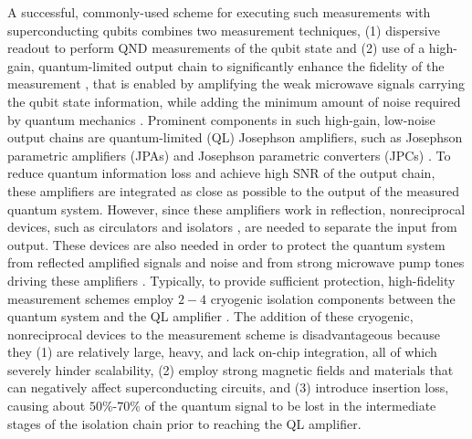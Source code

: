 \documentclass[aip,onecolumn,10pt]{revtex4}%
\begin{document}
A successful, commonly-used scheme for executing such measurements with superconducting qubits combines two measurement techniques, (1) dispersive readout to perform QND measurements of the qubit state \cite{QED,QEDcooperBox} and (2) use of a high-gain, quantum-limited output chain to significantly enhance the fidelity of the measurement \cite{QuantumJumps,QubitJPC}, that is enabled by amplifying the weak microwave signals carrying the qubit state information, while adding the minimum amount of noise required by quantum mechanics \cite{Caves,NoiseAmplReview}. Prominent components in such high-gain, low-noise output chains are quantum-limited (QL) Josephson amplifiers, such as Josephson parametric amplifiers (JPAs) \cite{JBA,VijayJBAreview,JBAMichael,CastellanosNat,Yamamoto} and Josephson parametric converters (JPCs) \cite{JPCnaturePhys,JPCnature,JPCreview} . To reduce quantum information loss and achieve high SNR of the output chain, these amplifiers are integrated as close as possible to the output of the measured quantum system. However, since these amplifiers work in reflection, nonreciprocal devices, such as circulators and isolators \cite{Pozar}, are needed to separate the input from output. These devices are also needed in order to protect the quantum system from reflected amplified signals and noise and from strong microwave pump tones driving these amplifiers \cite{VijayJBAreview}. Typically, to provide sufficient protection, high-fidelity measurement schemes employ $2-4$ cryogenic isolation components between the quantum system and the QL amplifier \cite{QuantumJumps,QubitJPC}. The addition of these cryogenic, nonreciprocal devices \cite{quinstar} to the measurement scheme is disadvantageous because they (1) are relatively large, heavy, and lack on-chip integration, all of which severely hinder scalability, (2) employ strong magnetic fields and materials that can negatively affect superconducting circuits, and (3) introduce insertion loss, causing about $50\%$-$70\%$ of the quantum signal to be lost in the intermediate stages of the isolation chain prior to reaching the QL amplifier.    
\end{document}
